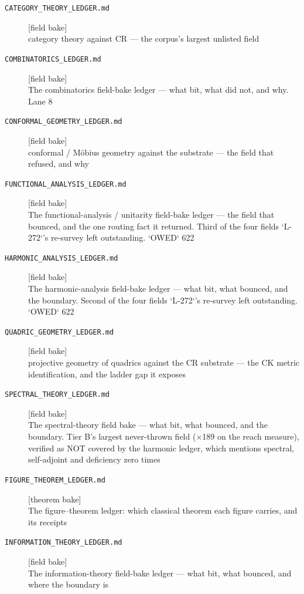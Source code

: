 \begin{description}
\item[\label{ldg:category_theory}\texttt{CATEGORY\_THEORY\_LEDGER.md}]\hfill\textsf{[field bake]}\\
category theory against CR --- the corpus's largest unlisted field
\item[\label{ldg:combinatorics}\texttt{COMBINATORICS\_LEDGER.md}]\hfill\textsf{[field bake]}\\
The combinatorics field-bake ledger --- what bit, what did not, and why. Lane 8
\item[\label{ldg:conformal_geometry}\texttt{CONFORMAL\_GEOMETRY\_LEDGER.md}]\hfill\textsf{[field bake]}\\
conformal / M\"obius geometry against the substrate --- the field that refused, and why
\item[\label{ldg:functional_analysis}\texttt{FUNCTIONAL\_ANALYSIS\_LEDGER.md}]\hfill\textsf{[field bake]}\\
The functional-analysis / unitarity field-bake ledger --- the field that bounced, and the one routing fact it returned. Third of the four fields `L-272`'s re-survey left outstanding. `OWED` 622
\item[\label{ldg:harmonic_analysis}\texttt{HARMONIC\_ANALYSIS\_LEDGER.md}]\hfill\textsf{[field bake]}\\
The harmonic-analysis field-bake ledger --- what bit, what bounced, and the boundary. Second of the four fields `L-272`'s re-survey left outstanding. `OWED` 622
\item[\label{ldg:quadric_geometry}\texttt{QUADRIC\_GEOMETRY\_LEDGER.md}]\hfill\textsf{[field bake]}\\
projective geometry of quadrics against the CR substrate --- the CK metric identification, and the ladder gap it exposes
\item[\label{ldg:spectral_theory}\texttt{SPECTRAL\_THEORY\_LEDGER.md}]\hfill\textsf{[field bake]}\\
The spectral-theory field bake --- what bit, what bounced, and the boundary. Tier B's largest never-thrown field ($\times$189 on the reach measure), verified as NOT covered by the harmonic ledger, which mentions spectral, self-adjoint and deficiency zero times
\item[\label{ldg:figure_theorem}\texttt{FIGURE\_THEOREM\_LEDGER.md}]\hfill\textsf{[theorem bake]}\\
The figure--theorem ledger: which classical theorem each figure carries, and its receipts
\item[\label{ldg:information_theory}\texttt{INFORMATION\_THEORY\_LEDGER.md}]\hfill\textsf{[field bake]}\\
The information-theory field-bake ledger --- what bit, what bounced, and where the boundary is
\end{description}
\endgroup
